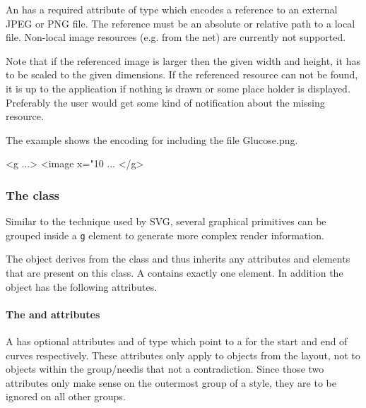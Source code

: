 An \Image has a required attribute  of type
 which encodes a reference to an external JPEG or PNG file. The reference must be an absolute or relative path to a local file.
Non-local image resources (e.g. from the net) are currently not supported.


Note that if the referenced image is larger then the given 
width and height, it has to be scaled to the given dimensions.
If the referenced resource can not be found, it is up to the application if nothing is drawn or some place holder is displayed.
Preferably the user would get some kind of notification about the missing resource.

The example shows the encoding for including the file Glucose.png.
{
\footnotesize
\begin{example}
 <g ...>
  <image x="10%
      ...
</g> 
\end{example}
}


\subsubsection{The  class}
\label{rendergroup-class}

Similar to the technique used by SVG, several graphical primitives can be grouped inside a \texttt{g} 
element to generate more complex render information.



The \RenderGroup object derives from the \GraphicalPrimitiveTwoD class
and thus inherits any attributes and elements that are present on this
class.
A \RenderGroup contains exactly one \ListOfElements element.
In addition the \RenderGroup object has the following attributes.

\paragraph{The \fixttspace{} and \fixttspace{} attributes}

A \RenderGroup has optional attributes  and  of type
 which point to a \LineEnding for the start and end of curves respectively. These attributes only apply to \RenderCurve objects from the layout, not
to \RenderCurve objects within the group/need{is that not a contradiction}. Since those two attributes only make sense on the outermost group of a style,
they are to be ignored on all other groups. 

